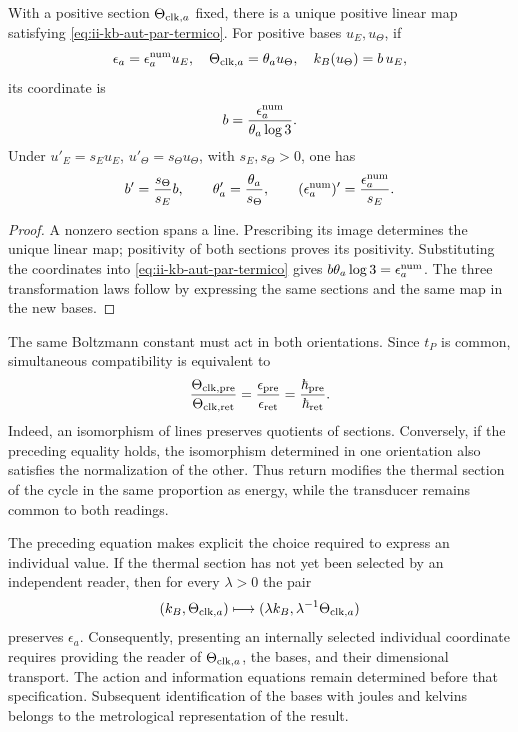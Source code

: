 \begin{theorem}
With a positive section \(\Theta_{{\rm clk},a}\) fixed, there is a
unique positive linear map satisfying
\eqref{eq:ii-kb-aut-par-termico}. For positive bases \(u_E,u_\Theta\),
if
\[
 \epsilon_a=\epsilon_a^{\rm num}u_E,\quad
 \Theta_{{\rm clk},a}=\theta_a u_\Theta,\quad
 k_B(u_\Theta)=b\,u_E,
\]
its coordinate is
\begin{equation}
 b=\frac{\epsilon_a^{\rm num}}{\theta_a\log3}.
 \label{eq:ii-kb-aut-coordenada}
\end{equation}
Under \(u'_E=s_Eu_E\), \(u'_\Theta=s_\Theta u_\Theta\), with
\(s_E,s_\Theta>0\), one has
\[
 b'=\frac{s_\Theta}{s_E}b,\qquad
 \theta'_a=\frac{\theta_a}{s_\Theta},\qquad
 (\epsilon_a^{\rm num})'=\frac{\epsilon_a^{\rm num}}{s_E}.
\]
\end{theorem}
\begin{proof}
A nonzero section spans a line. Prescribing its image determines
the unique linear map; positivity of both sections proves
its positivity. Substituting the coordinates into
\eqref{eq:ii-kb-aut-par-termico} gives
\(b\theta_a\log3=\epsilon_a^{\rm num}\). The three transformation
laws follow by expressing the same sections and the same
map in the new bases.
\end{proof}

The same Boltzmann constant must act in both orientations.
Since \(t_P\) is common, simultaneous compatibility is equivalent to
\begin{equation}
 \frac{\Theta_{{\rm clk},{\rm pre}}}{\Theta_{{\rm clk},{\rm ret}}}
 =\frac{\epsilon_{\rm pre}}{\epsilon_{\rm ret}}
 =\frac{\hbar_{\rm pre}}{\hbar_{\rm ret}}.
 \label{eq:ii-kb-aut-orientaciones}
\end{equation}
Indeed, an isomorphism of lines preserves quotients of sections.
Conversely, if the preceding equality holds, the isomorphism
determined in one orientation also satisfies the normalization of
the other. Thus return modifies the thermal section of the cycle in the
same proportion as energy, while the transducer remains
common to both readings.

The preceding equation makes explicit the choice required to express an
individual value. If the thermal section has not yet been selected
by an independent reader, then for every \(\lambda>0\) the pair
\[
 (k_B,\Theta_{{\rm clk},a})
 \longmapsto(\lambda k_B,\lambda^{-1}\Theta_{{\rm clk},a})
\]
preserves \(\epsilon_a\). Consequently, presenting an
internally selected individual coordinate requires providing the reader of
\(\Theta_{{\rm clk},a}\), the bases, and their dimensional transport.
The action and information equations remain determined before
that specification. Subsequent identification of the bases with
joules and kelvins belongs to the metrological representation of the result.

